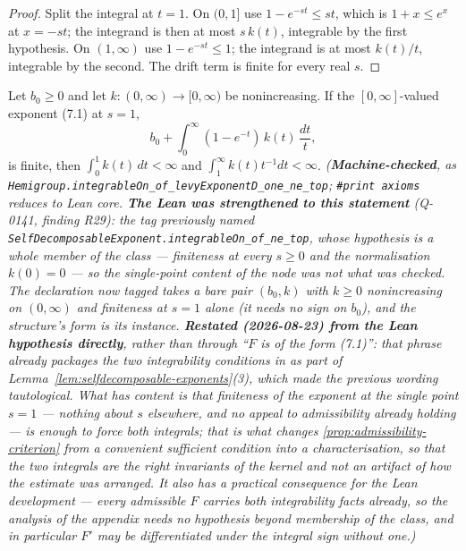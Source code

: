 \begin{proof}
\leanok
Split the integral at $t = 1$. On $(0,1]$ use $1 - e^{-st} \le st$, which is $1 + x \le e^x$ at
$x = -st$; the integrand is then at most $s\,k(t)$, integrable by the first hypothesis. On
$(1,\infty)$ use $1 - e^{-st} \le 1$; the integrand is at most $k(t)/t$, integrable by the
second. The drift term is finite for every real $s$.
\end{proof}

\begin{lemma}\label{lem:criterion-converse}
\leanok
Let $b_0 \ge 0$ and let $k : (0,\infty) \to [0,\infty)$ be nonincreasing. If the $[0,\infty]$-valued
exponent (7.1) at $s = 1$,
\[
  b_0 + \int_0^\infty (1 - e^{-t})\,k(t)\,\frac{dt}{t} ,
\]
is finite, then $\int_0^1 k(t)\,dt < \infty$ and $\int_1^\infty k(t)t^{-1}dt < \infty$.
\statusT\quad\emph{(\textbf{Machine-checked}, as
\texttt{Hemigroup.integrableOn\_of\_levyExponentD\_one\_ne\_top}; \texttt{\#print axioms}
reduces to Lean core. \textbf{The Lean was strengthened to this statement} (Q-0141, finding R29):
the tag previously named \texttt{SelfDecomposableExponent.integrableOn\_of\_ne\_top}, whose
hypothesis is a whole member of the class --- finiteness at \emph{every} $s \ge 0$ and the
normalisation $k(0) = 0$ --- so the single-point content of the node was not what was checked. The
declaration now tagged takes a bare pair $(b_0, k)$ with $k \ge 0$ nonincreasing on $(0,\infty)$
and finiteness at $s = 1$ alone (it needs no sign on $b_0$), and the structure's form is its
instance. \textbf{Restated (2026-08-23) from the Lean hypothesis directly}, rather
than through ``$F$ is of the form (7.1)'': that phrase already packages the two integrability
conditions in as part of Lemma~\ref{lem:selfdecomposable-exponents}(3), which made the previous
wording tautological. What has content is that finiteness of the exponent at the single point
$s = 1$ --- nothing about $s$ elsewhere, and no appeal to admissibility already holding --- is
enough to force both integrals; that is what changes \ref{prop:admissibility-criterion} from a
convenient sufficient condition into a characterisation, so that the two integrals are the right
invariants of the kernel and not an artifact of how the estimate was arranged. It also has a
practical consequence for the Lean development --- every admissible $F$ carries both
integrability facts \emph{already}, so the analysis of the appendix needs no hypothesis beyond
membership of the class, and in particular $F'$ may be differentiated under the integral sign
without one.)}


\end{lemma}
